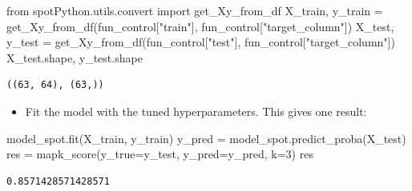 \documentclass[
  letterpaper,
  DIV=11,
  numbers=noendperiod]{scrreprt}
\newenvironment{Shaded}{\begin{snugshade}}{\end{snugshade}}
\newcommand{\DecValTok}[1]{\textcolor[rgb]{0.68,0.00,0.00}{#1}}
\newcommand{\ImportTok}[1]{\textcolor[rgb]{0.00,0.46,0.62}{#1}}
\newcommand{\NormalTok}[1]{\textcolor[rgb]{0.00,0.23,0.31}{#1}}
\newcommand{\OperatorTok}[1]{\textcolor[rgb]{0.37,0.37,0.37}{#1}}
\newcommand{\StringTok}[1]{\textcolor[rgb]{0.13,0.47,0.30}{#1}}
\providecommand{\tightlist}{%
  \setlength{\itemsep}{0pt}\setlength{\parskip}{0pt}}\usepackage{longtable,booktabs,array}
\begin{document}
\begin{Shaded}
\begin{Highlighting}[]
\ImportTok{from}\NormalTok{ spotPython.utils.convert }\ImportTok{import}\NormalTok{ get\_Xy\_from\_df}
\NormalTok{X\_train, y\_train }\OperatorTok{=}\NormalTok{ get\_Xy\_from\_df(fun\_control[}\StringTok{"train"}\NormalTok{], fun\_control[}\StringTok{"target\_column"}\NormalTok{])}
\NormalTok{X\_test, y\_test }\OperatorTok{=}\NormalTok{ get\_Xy\_from\_df(fun\_control[}\StringTok{"test"}\NormalTok{], fun\_control[}\StringTok{"target\_column"}\NormalTok{])}
\NormalTok{X\_test.shape, y\_test.shape}
\end{Highlighting}
\end{Shaded}

\begin{verbatim}
((63, 64), (63,))
\end{verbatim}

\begin{itemize}
\tightlist
\item
  Fit the model with the tuned hyperparameters. This gives one result:
\end{itemize}

\begin{Shaded}
\begin{Highlighting}[]
\NormalTok{model\_spot.fit(X\_train, y\_train)}
\NormalTok{y\_pred }\OperatorTok{=}\NormalTok{ model\_spot.predict\_proba(X\_test)}
\NormalTok{res }\OperatorTok{=}\NormalTok{ mapk\_score(y\_true}\OperatorTok{=}\NormalTok{y\_test, y\_pred}\OperatorTok{=}\NormalTok{y\_pred, k}\OperatorTok{=}\DecValTok{3}\NormalTok{)}
\NormalTok{res}
\end{Highlighting}
\end{Shaded}

\begin{verbatim}
0.8571428571428571
\end{verbatim}
\end{document}
